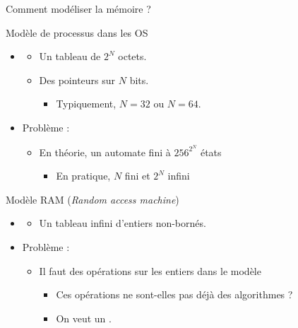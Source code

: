 
\begingroup

\begin{frame}{Comment modéliser la mémoire ?}

  \begin{block}{Modèle de processus dans les OS}
    \begin{itemize}
    \item {}
      \begin{itemize}
      \item Un tableau de $2^N$ octets.
      \item Des pointeurs sur $N$ bits.
        \begin{itemize}
        \item Typiquement, $N=32$ ou $N=64$.
        \end{itemize}
      \end{itemize}
    \item \alert{Problème :} 
      \begin{itemize}
      \item En théorie, un automate fini à $256^{2^N}$ états
        \begin{itemize}
        \item En pratique, $N$ fini et $2^N$ infini
        \end{itemize}
      \end{itemize}
    \end{itemize}
  \end{block}

  \pause

  \begin{block}{Modèle RAM (\emph{Random access machine})}
    \begin{itemize}
    \item {}
      \begin{itemize}
      \item Un tableau infini d'entiers non-bornés.
      \end{itemize}
    \item \alert{Problème :} 
      \begin{itemize}
      \item Il faut des opérations sur les entiers dans le modèle
        \begin{itemize}
        \item Ces opérations ne sont-elles pas déjà des algorithmes ?
        \item On veut un .
        \end{itemize}
      \end{itemize}
    \end{itemize}
  \end{block}

\end{frame}

\endgroup
\endinput

